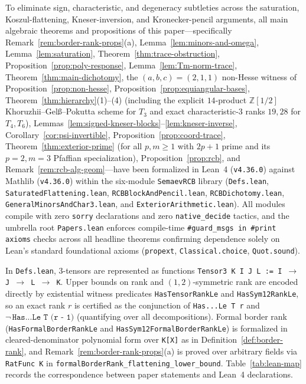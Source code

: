 \documentclass[11pt,reqno]{amsart}
\theoremstyle{definition}
\theoremstyle{remark}
\numberwithin{equation}{section}
\newcommand{\ZZ}{\mathbb{Z}}
\begin{document}
To eliminate sign, characteristic, and degeneracy subtleties across the saturation, Koszul-flattening, Kneser-inversion, and Kronecker-pencil arguments, all main algebraic theorems and propositions of this paper---specifically Remark~\ref{rem:border-rank-props}(a), Lemma~\ref{lem:minors-and-omega}, Lemma~\ref{lem:saturation}, Theorem~\ref{thm:trace-obstruction}, Proposition~\ref{prop:poly-response}, Lemma~\ref{lem:Tm-norm-trace}, Theorem~\ref{thm:main-dichotomy}, the $(a,b,c) = (2,1,1)$ non-Hesse witness of Proposition~\ref{prop:non-hesse}, Proposition~\ref{prop:equiangular-bases}, Theorem~\ref{thm:hierarchy}(1)--(4) (including the explicit $14$-product $\ZZ[1/2]$ Khoruzhii--Gel\ss--Pokutta scheme for $T_3$ and exact characteristic-$3$ ranks $19, 28$ for $T_4, T_6$), Lemmas~\ref{lem:signed-kneser-blocks}--\ref{lem:kneser-inverse}, Corollary~\ref{cor:psi-invertible}, Proposition~\ref{prop:coord-trace}, Theorem~\ref{thm:exterior-prime} (for all $p, m \ge 1$ with $2p + 1$ prime and its $p = 2, m = 3$ Pfaffian specialization), Proposition~\ref{prop:rcb}, and Remark~\ref{rem:rcb-alg-geom}---have been formalized in Lean~4 (\texttt{v4.36.0}) against Mathlib (\texttt{v4.36.0}) within the six-module \texttt{SemaevRCB} library (\texttt{Defs.lean}, \texttt{SaturatedFlattening.lean}, \texttt{RCBBlockAndPencil.lean}, \texttt{RCBDichotomy.lean}, \texttt{GeneralMinorsAndChar3.lean}, and \texttt{ExteriorArithmetic.lean}). All modules compile with zero \texttt{sorry} declarations and zero \texttt{native\_decide} tactics, and the umbrella root \texttt{Papers.lean} enforces compile-time \texttt{\#guard\_msgs in \#print axioms} checks across all headline theorems confirming dependence solely on Lean's standard foundational axioms (\texttt{propext}, \texttt{Classical.choice}, \texttt{Quot.sound}).

In \texttt{Defs.lean}, $3$-tensors are represented as functions \texttt{Tensor3 K I J L := I $\to$ J $\to$ L $\to$ K}. Upper bounds on rank and $(1,2)$-symmetric rank are encoded directly by existential witness predicates \texttt{HasTensorRankLe} and \texttt{HasSym12RankLe}, so an exact rank $r$ is certified as the conjunction of \texttt{Has...Le T r} and $\lnot\,\texttt{Has...Le T (r - 1)}$ (quantifying over all decompositions). Formal border rank (\texttt{HasFormalBorderRankLe} and \texttt{HasSym12FormalBorderRankLe}) is formalized in cleared-denominator polynomial form over \texttt{K[X]} as in Definition~\ref{def:border-rank}, and Remark~\ref{rem:border-rank-props}(a) is proved over arbitrary fields via \texttt{RatFunc K} in \texttt{formalBorderRank\_flattening\_lower\_bound}. Table~\ref{tab:lean-map} records the correspondence between paper statements and Lean~4 declarations.
\end{document}
